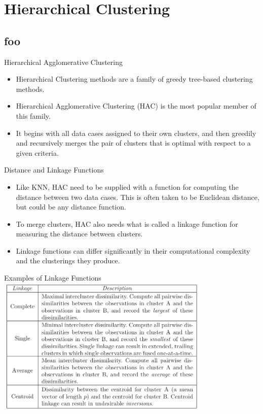 \documentclass[serif,xcolor=pdftex,dvipsnames,table,hyperref={bookmarks=false,breaklinks}]{beamer}
\begin{document}
\section{Hierarchical Clustering}
\subsection{foo}

\begin{frame}[t]{Hierarchical Agglomerative Clustering}

\begin{itemize}
\item Hierarchical Clustering methods are a family of greedy tree-based 
clustering methods.

\pause\item Hierarchical Agglomerative Clustering (HAC)  is the most popular 
member of this family.

\pause\item It begins with all data cases assigned to their own clusters, and 
then greedily and recursively merges the pair of clusters that is optimal with 
respect to a given criteria.

\end{itemize}

\end{frame}

\begin{frame}[t]{Distance and Linkage Functions}

\begin{itemize}
\item Like KNN, HAC need to be supplied with a function for computing the 
distance between two data cases. This is often taken to be Euclidean 
distance, but could be any distance function.

\pause\item To merge clusters, HAC also needs what is called a linkage function 
for measuring the distance between clusters. 

\pause\item Linkage functions can differ 
significantly in their computational complexity and the clusterings they 
produce.
\end{itemize}

\end{frame}

\begin{frame}[t]{Examples of Linkage Functions}
\center
\includegraphics[width=4in]{../Figures/linkage.png}
\end{frame}
\end{document}
